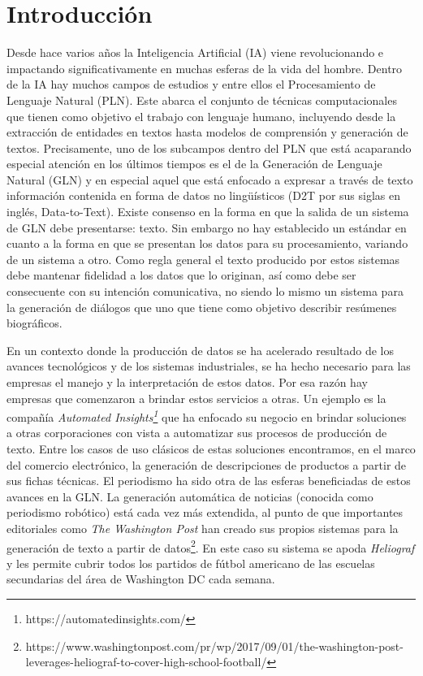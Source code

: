 \chapter*{Introducción}\label{chapter:introduction}

    Desde hace varios años la Inteligencia Artificial (IA) viene revolucionando e \\impactando significativamente en muchas esferas de la 
vida del hombre. Dentro de la IA hay muchos campos de estudios y entre ellos el Procesamiento de Lenguaje Natural (PLN). Este abarca el conjunto de 
t\'ecnicas computacionales que tienen como objetivo el trabajo con lenguaje humano, incluyendo desde la extracci\'on de entidades en textos hasta modelos 
de comprensi\'on y generación de textos. Precisamente, uno de los subcampos dentro del PLN que está acaparando especial atención en 
los últimos tiempos es el de la Generación de Lenguaje Natural (GLN) y en especial aquel que está enfocado a expresar a través de texto 
información contenida en forma de datos no lingüísticos (D2T por sus siglas en inglés, Data-to-Text). Existe consenso en la forma en 
que la salida de un sistema de GLN debe presentarse: texto. Sin embargo no hay establecido un est\'andar en cuanto a la forma en 
que se presentan los datos para su procesamiento, variando de un sistema a otro. Como regla general el texto producido por estos sistemas 
debe mantenar fidelidad a los datos que lo originan, así como debe ser consecuente con su intención comunicativa, no siendo lo mismo un 
sistema para la generación de diálogos que uno que tiene como objetivo describir resúmenes biográficos.

    En un contexto donde la producción de datos se ha acelerado resultado de los avances tecnológicos y de los sistemas industriales, se ha hecho necesario para 
las empresas el manejo y la interpretación de estos datos. Por esa raz\'on hay empresas que comenzaron a brindar estos servicios a otras. Un ejemplo es la compañía 
\textit{Automated Insights\footnote[1]{https://automatedinsights.com/}} que ha enfocado su negocio en brindar soluciones a otras corporaciones con vista a automatizar sus 
procesos de producción de texto. Entre los casos de uso clásicos de estas soluciones encontramos, en el marco del comercio electr\'onico, la generación de descripciones de 
productos a partir de sus fichas técnicas. El periodismo ha sido otra de las esferas beneficiadas de estos avances en la GLN. La generación automática de noticias (conocida como 
periodismo robótico) está cada vez más extendida, al punto de que importantes editoriales como \textit{The Washington Post} han creado sus propios sistemas para la generación de 
texto a partir de datos\footnote[2]{https://www.washingtonpost.com/pr/wp/2017/09/01/the-washington-post-leverages-heliograf-to-cover-high-school-football/}. 
En este caso su sistema se apoda \textit{Heliograf} y les permite cubrir todos los partidos de fútbol americano de las escuelas secundarias del área de Washington DC 
cada semana.

